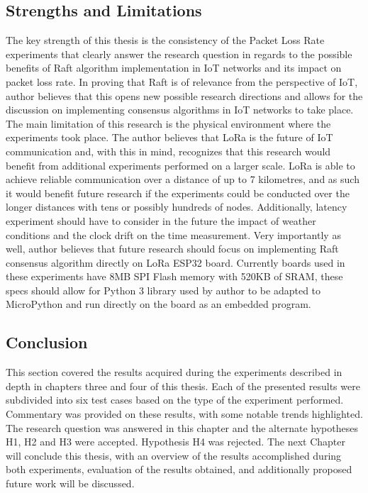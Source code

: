 \documentclass[oneside,12pt]{book}
\begin{document}
\subsection{Strengths and Limitations}
The key strength of this thesis is the consistency of the Packet Loss Rate experiments that clearly answer the research question in regards to the possible benefits of Raft algorithm implementation in IoT networks and its impact on packet loss rate. In proving that Raft is of relevance from the perspective of IoT, author believes that this opens new possible research directions and allows for the discussion on implementing consensus algorithms in IoT networks to take place.\smallskip \newline 
The main limitation of this research is the physical environment where the experiments took place. The author believes that LoRa is the future of IoT communication and, with this in mind, recognizes that this research would benefit from additional experiments performed on a larger scale. LoRa is able to achieve reliable communication over a distance of up to 7 kilometres, and as such it would benefit future research if the experiments could be conducted over the longer distances with tens or possibly hundreds of nodes. Additionally, latency experiment should have to consider in the future the impact of weather conditions \citep{9599884} and the clock drift \citep{s21041193} on the time measurement.\smallskip \newline
Very importantly as well, author believes that future research should focus on implementing Raft consensus algorithm directly on LoRa ESP32 board. Currently boards used in these experiments have 8MB SPI Flash memory with 520KB of SRAM, these specs should allow for Python 3 library used by author to be adapted to MicroPython and run directly on the board as an embedded program. 
\subsection{Conclusion}
This section covered the results acquired during the experiments described in depth in chapters three and four of this thesis. Each of the presented results were subdivided into six test cases based on the type of the experiment performed. Commentary was provided on these results, with some notable trends highlighted. The research question was answered in this chapter and the alternate hypotheses H1, H2 and H3 were accepted. Hypothesis H4 was rejected.\smallskip \newline  
The next Chapter will conclude this thesis, with an overview of the results accomplished during both  experiments, evaluation of the results obtained, and additionally proposed future work will be discussed.
\end{document}
